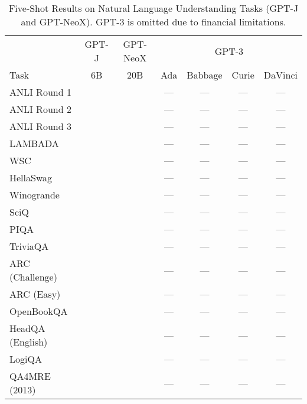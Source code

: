 \documentclass[11pt]{article}
\begin{document}
{\begin{landscape}
\begin{table*}
\centering \begin{tabular}{l c c c c c c } \\
 & GPT-J & GPT-NeoX & \multicolumn{4}{c}{GPT-3} \\
Task & 6B & 20B & Ada & Babbage & Curie & DaVinci\\ \toprule
ANLI Round 1 &  &  & ---  & --- & --- & --- \\ 
ANLI Round 2 &  &  & ---  & --- & --- & --- \\ 
ANLI Round 3 &  &  & ---  & --- & --- & --- \\ 
LAMBADA &  &  & ---  & --- & --- & --- \\ 
WSC &  &  & ---  & --- & --- & --- \\ 
HellaSwag &  &  & ---  & --- & --- & --- \\ 
Winogrande &  &  & ---  & --- & --- & --- \\ 
SciQ &  &  & ---  & --- & --- & --- \\ 
PIQA &  &  & ---  & --- & --- & --- \\ 
TriviaQA &  &  & ---  & --- & --- & --- \\ 
ARC (Challenge) &  &  & ---  & --- & --- & --- \\ 
ARC (Easy) &  &  & ---  & --- & --- & --- \\ 
OpenBookQA &  &  & ---  & --- & --- & --- \\ 
HeadQA (English) &  &  & ---  & --- & --- & --- \\ 
LogiQA &  &  & ---  & --- & --- & --- \\ 
QA4MRE (2013) &  &  & ---  & --- & --- & --- \\ 
\bottomrule 
\end{tabular}
\caption{Five-Shot Results on Natural Language Understanding Tasks (GPT-J and GPT-NeoX). GPT-3 is omitted due to financial limitations.}
\label{tab:nlu_gpt_5}
\end{table*}


\end{landscape}}
\end{document}
